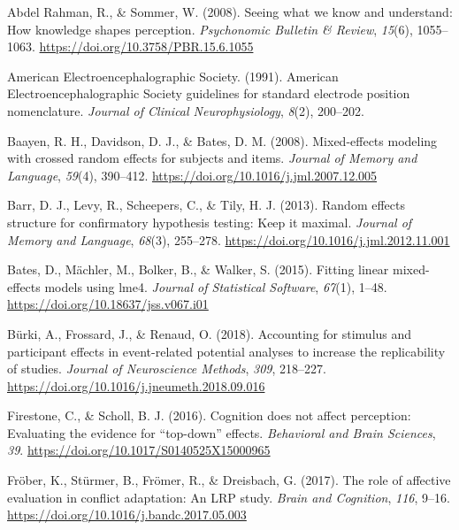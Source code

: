 \documentclass[
  english,
  man,11pt,floatsintext]{apa7}
\newlength{\cslhangindent}
\newenvironment{cslreferences}%
  {\setlength{\parindent}{0pt}%
  \everypar{\setlength{\hangindent}{\cslhangindent}}\ignorespaces}%
  {\par}
\begin{document}
\hypertarget{refs}{}
\begin{cslreferences}
\leavevmode\hypertarget{ref-abdelrahman2008}{}%
Abdel Rahman, R., \& Sommer, W. (2008). Seeing what we know and understand: How knowledge shapes perception. \emph{Psychonomic Bulletin \& Review}, \emph{15}(6), 1055--1063. \url{https://doi.org/10.3758/PBR.15.6.1055}

\leavevmode\hypertarget{ref-americanelectroencephalographicsociety1991}{}%
American Electroencephalographic Society. (1991). American Electroencephalographic Society guidelines for standard electrode position nomenclature. \emph{Journal of Clinical Neurophysiology}, \emph{8}(2), 200--202.

\leavevmode\hypertarget{ref-baayen2008}{}%
Baayen, R. H., Davidson, D. J., \& Bates, D. M. (2008). Mixed-effects modeling with crossed random effects for subjects and items. \emph{Journal of Memory and Language}, \emph{59}(4), 390--412. \url{https://doi.org/10.1016/j.jml.2007.12.005}

\leavevmode\hypertarget{ref-barr2013}{}%
Barr, D. J., Levy, R., Scheepers, C., \& Tily, H. J. (2013). Random effects structure for confirmatory hypothesis testing: Keep it maximal. \emph{Journal of Memory and Language}, \emph{68}(3), 255--278. \url{https://doi.org/10.1016/j.jml.2012.11.001}

\leavevmode\hypertarget{ref-R-lme4}{}%
Bates, D., Mächler, M., Bolker, B., \& Walker, S. (2015). Fitting linear mixed-effects models using lme4. \emph{Journal of Statistical Software}, \emph{67}(1), 1--48. \url{https://doi.org/10.18637/jss.v067.i01}

\leavevmode\hypertarget{ref-buxfcrki2018}{}%
Bürki, A., Frossard, J., \& Renaud, O. (2018). Accounting for stimulus and participant effects in event-related potential analyses to increase the replicability of studies. \emph{Journal of Neuroscience Methods}, \emph{309}, 218--227. \url{https://doi.org/10.1016/j.jneumeth.2018.09.016}

\leavevmode\hypertarget{ref-firestone2016}{}%
Firestone, C., \& Scholl, B. J. (2016). Cognition does not affect perception: Evaluating the evidence for ``top-down'' effects. \emph{Behavioral and Brain Sciences}, \emph{39}. \url{https://doi.org/10.1017/S0140525X15000965}

\leavevmode\hypertarget{ref-fruxf6ber2017}{}%
Fröber, K., Stürmer, B., Frömer, R., \& Dreisbach, G. (2017). The role of affective evaluation in conflict adaptation: An LRP study. \emph{Brain and Cognition}, \emph{116}, 9--16. \url{https://doi.org/10.1016/j.bandc.2017.05.003}


\end{cslreferences}
\end{document}
